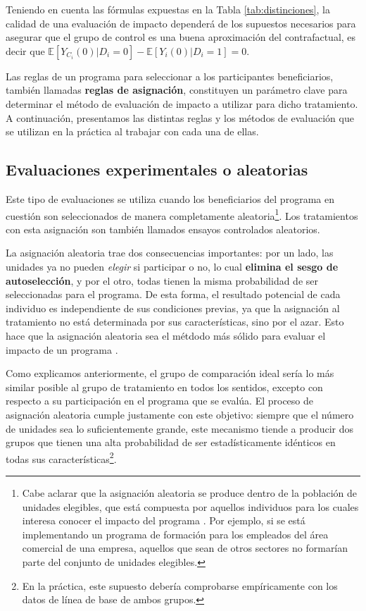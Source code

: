 \documentclass[../../main.tex]{subfiles}
\begin{document}
Teniendo en cuenta las fórmulas expuestas en la Tabla \ref{tab:distinciones}, la calidad
de una evaluación de impacto dependerá de los supuestos necesarios para asegurar que el
grupo de control es una buena aproximación del contrafactual, es decir que \(\mathbb{E}
\left[Y_{C_i}(0)|D_i=0\right] - \mathbb{E}\left[Y_i(0)|D_i=1\right] = 0\).

\bigskip
Las reglas de un programa para seleccionar a los participantes beneficiarios, también
llamadas \textbf{reglas de asignación}, constituyen un parámetro clave para determinar el
método de evaluación de impacto a utilizar para dicho tratamiento. A continuación,
presentamos las distintas reglas y los métodos de evaluación que se utilizan en la
práctica al trabajar con cada una de ellas.

\subsection{Evaluaciones experimentales o aleatorias}
Este tipo de evaluaciones se utiliza cuando los beneficiarios del programa en cuestión son
seleccionados de manera completamente aleatoria\footnote{Cabe aclarar que la asignación
aleatoria se produce dentro de la población de unidades elegibles, que está compuesta por
aquellos individuos para los cuales interesa conocer el impacto del programa
\cite{gertler-2016}. Por ejemplo, si se está implementando un programa de formación para
los empleados del área comercial de una empresa, aquellos que sean de otros sectores no
formarían parte del conjunto de unidades elegibles.}. Los tratamientos con esta asignación
son también llamados ensayos controlados aleatorios.

La asignación aleatoria trae dos consecuencias importantes: por un lado, las unidades ya
no pueden \textit{elegir} si participar o no, lo cual \textbf{elimina el sesgo de
autoselección}, y por el otro, todas tienen la misma probabilidad de ser seleccionadas
para el programa. De esta forma, el resultado potencial de cada individuo es independiente
de sus condiciones previas, ya que la asignación al tratamiento no está determinada por
sus características, sino por el azar. Esto hace que la asignación aleatoria sea el
métdodo más sólido para evaluar el impacto de un programa \cite{gertler-2016}.

Como explicamos anteriormente, el grupo de comparación ideal sería lo más similar posible
al grupo de tratamiento en todos los sentidos, excepto con respecto a su participación en
el programa que se evalúa. El proceso de asignación aleatoria cumple justamente con este
objetivo: siempre que el número de unidades sea lo suficientemente grande, este mecanismo
tiende a producir dos grupos que tienen una alta probabilidad de ser estadísticamente
idénticos en todas sus características\cite{gertler-2016}\footnote{En la práctica, este
supuesto debería comprobarse empíricamente con los datos de línea de base de ambos
grupos.}.
\end{document}
